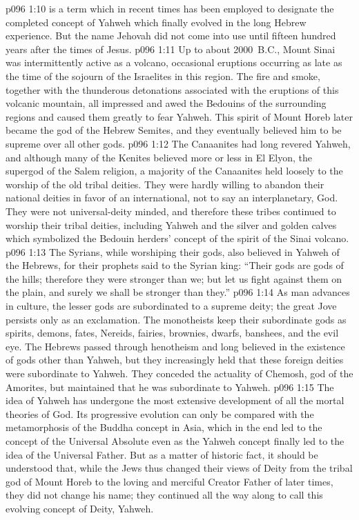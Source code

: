 \pc \vs p096 1:10  is a term which in recent times has been employed to designate the completed concept of Yahweh which finally evolved in the long Hebrew experience. But the name Jehovah did not come into use until fifteen hundred years after the times of Jesus.
\pc \vs p096 1:11 Up to about 2000~B.C., Mount Sinai was intermittently active as a volcano, occasional eruptions occurring as late as the time of the sojourn of the Israelites in this region. The fire and smoke, together with the thunderous detonations associated with the eruptions of this volcanic mountain, all impressed and awed the Bedouins of the surrounding regions and caused them greatly to fear Yahweh. This spirit of Mount Horeb later became the god of the Hebrew Semites, and they eventually believed him to be supreme over all other gods.
\vs p096 1:12 The Canaanites had long revered Yahweh, and although many of the Kenites believed more or less in El Elyon, the supergod of the Salem religion, a majority of the Canaanites held loosely to the worship of the old tribal deities. They were hardly willing to abandon their national deities in favor of an international, not to say an interplanetary, God. They were not universal\hyp{}deity minded, and therefore these tribes continued to worship their tribal deities, including Yahweh and the silver and golden calves which symbolized the Bedouin herders’ concept of the spirit of the Sinai volcano.
\vs p096 1:13 The Syrians, while worshiping their gods, also believed in Yahweh of the Hebrews, for their prophets said to the Syrian king: “Their gods are gods of the hills; therefore they were stronger than we; but let us fight against them on the plain, and surely we shall be stronger than they.”
\vs p096 1:14 As man advances in culture, the lesser gods are subordinated to a supreme deity; the great Jove persists only as an exclamation. The monotheists keep their subordinate gods as spirits, demons, fates, Nereids, fairies, brownies, dwarfs, banshees, and the evil eye. The Hebrews passed through henotheism and long believed in the existence of gods other than Yahweh, but they increasingly held that these foreign deities were subordinate to Yahweh. They conceded the actuality of Chemosh, god of the Amorites, but maintained that he was subordinate to Yahweh.
\vs p096 1:15 The idea of Yahweh has undergone the most extensive development of all the mortal theories of God. Its progressive evolution can only be compared with the metamorphosis of the Buddha concept in Asia, which in the end led to the concept of the Universal Absolute even as the Yahweh concept finally led to the idea of the Universal Father. But as a matter of historic fact, it should be understood that, while the Jews thus changed their views of Deity from the tribal god of Mount Horeb to the loving and merciful Creator Father of later times, they did not change his name; they continued all the way along to call this evolving concept of Deity, Yahweh.

